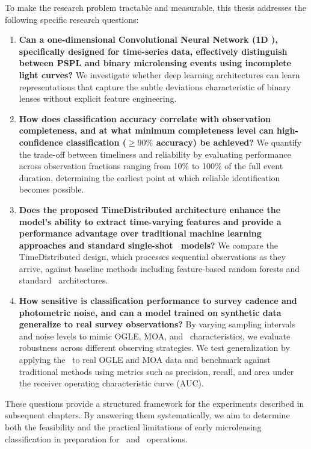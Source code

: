 To make the research problem tractable and measurable, this thesis addresses the following specific research questions:

\begin{enumerate}
    \item \textbf{Can a one-dimensional Convolutional Neural Network (1D \cnn), specifically designed for time-series data, effectively distinguish between PSPL and binary microlensing events using incomplete light curves?} We investigate whether deep learning architectures can learn representations that capture the subtle deviations characteristic of binary lenses without explicit feature engineering.
    
    \item \textbf{How does classification accuracy correlate with observation completeness, and at what minimum completeness level can high-confidence classification ($\geq\!90\%$ accuracy) be achieved?} We quantify the trade-off between timeliness and reliability by evaluating performance across observation fractions ranging from 10\% to 100\% of the full event duration, determining the earliest point at which reliable identification becomes possible.
    
    \item \textbf{Does the proposed TimeDistributed architecture enhance the model's ability to extract time-varying features and provide a performance advantage over traditional machine learning approaches and standard single-shot \cnn\ models?} We compare the TimeDistributed design, which processes sequential observations as they arrive, against baseline methods including feature-based random forests and standard \cnn\ architectures.
    
    \item \textbf{How sensitive is classification performance to survey cadence and photometric noise, and can a model trained on synthetic data generalize to real survey observations?} By varying sampling intervals and noise levels to mimic OGLE, MOA, and \lsst\ characteristics, we evaluate robustness across different observing strategies. We test generalization by applying the \cnn\ to real OGLE and MOA data and benchmark against traditional methods using metrics such as precision, recall, and area under the receiver operating characteristic curve (AUC).
\end{enumerate}

These questions provide a structured framework for the experiments described in subsequent chapters. By answering them systematically, we aim to determine both the feasibility and the practical limitations of early microlensing classification in preparation for \lsst\ and \romantel\ operations.

